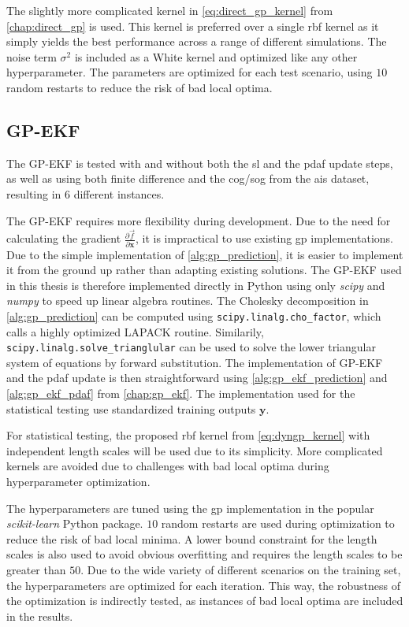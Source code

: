 The slightly more complicated kernel in \cref{eq:direct_gp_kernel} from \cref{chap:direct_gp} is used. This kernel is preferred over a single \acrshort{rbf} kernel as it simply yields the best performance across a range of different simulations. The noise term $\sigma^2$ is included as a White kernel and optimized like any other hyperparameter. The parameters are optimized for each test scenario, using $10$ random restarts to reduce the risk of bad local optima.

\subsection{GP-EKF}
The GP-EKF is tested with and without both the \acrshort{sl} and the \acrshort{pdaf} update steps, as well as using both finite difference and the \acrshort{cog}/\acrshort{sog} from the \acrshort{ais} dataset, resulting in $6$ different instances.

The GP-EKF requires more flexibility during development. Due to the need for calculating the gradient $\frac{\partial \vec{f}}{\partial \boldsymbol{x}}$, it is impractical to use existing \acrshort{gp} implementations. Due to the simple implementation of \cref{alg:gp_prediction}, it is easier to implement it from the ground up rather than adapting existing solutions.
The GP-EKF used in this thesis is therefore implemented directly in Python using only \textit{scipy}\cite{scipy} and \textit{numpy}\cite{numpy} to speed up linear algebra routines. The Cholesky decomposition in \cref{alg:gp_prediction} can be computed using \texttt{scipy.linalg.cho\_factor}, which calls a highly optimized LAPACK routine. Similarily, \texttt{scipy.linalg.solve\_\-trianglular} can be used to solve the lower triangular system of equations by forward substitution. The implementation of GP-EKF and the \acrshort{pdaf} update is then straightforward using \cref{alg:gp_ekf_prediction} and \cref{alg:gp_ekf_pdaf} from \cref{chap:gp_ekf}. The implementation used for the statistical testing use standardized training outputs $\boldsymbol{y}$.

For statistical testing, the proposed \acrshort{rbf} kernel from \cref{eq:dyngp_kernel} with independent length scales will be used due to its simplicity. More complicated kernels are avoided due to challenges with bad local optima during hyperparameter optimization.

The hyperparameters are tuned using the \acrshort{gp} implementation in the popular \textit{scikit-learn} \cite{scikit-learn} Python package. $10$ random restarts are used during optimization to reduce the risk of bad local minima. A lower bound constraint for the length scales is also used to avoid obvious overfitting and requires the length scales to be greater than $50$. Due to the wide variety of different scenarios on the training set, the hyperparameters are optimized for each iteration. This way, the robustness of the optimization is indirectly tested, as instances of bad local optima are included in the results.


